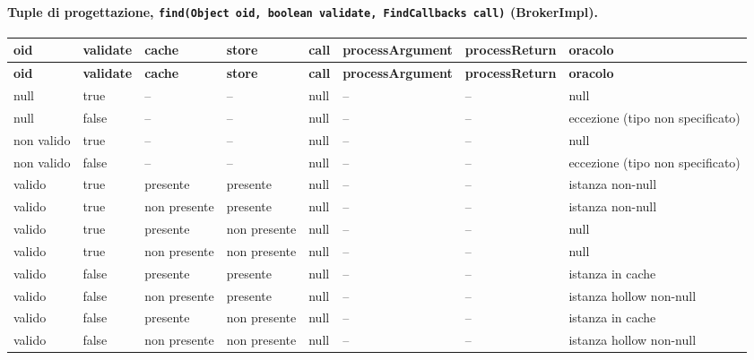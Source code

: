 \paragraph*{Tuple di progettazione, \texttt{find(Object oid, boolean validate, FindCallbacks call)} (BrokerImpl).}

{\footnotesize\setlength{\tabcolsep}{3pt}
\begin{longtable}{>{\raggedright\arraybackslash}p{}>{\raggedright\arraybackslash}p{}>{\raggedright\arraybackslash}p{}>{\raggedright\arraybackslash}p{}>{\raggedright\arraybackslash}p{}>{\raggedright\arraybackslash}p{}>{\raggedright\arraybackslash}p{}>{\raggedright\arraybackslash}p{}}
\toprule
\textbf{oid} & \textbf{validate} & \textbf{cache} & \textbf{store} & \textbf{call} & \textbf{processArgument} & \textbf{processReturn} & \textbf{oracolo} \\
\midrule
\endfirsthead
\toprule
\textbf{oid} & \textbf{validate} & \textbf{cache} & \textbf{store} & \textbf{call} & \textbf{processArgument} & \textbf{processReturn} & \textbf{oracolo} \\
\midrule
\endhead
\bottomrule
\endfoot
null & true & -- & -- & null & -- & -- & null \\
null & false & -- & -- & null & -- & -- & eccezione (tipo non specificato) \\
non valido & true & -- & -- & null & -- & -- & null \\
non valido & false & -- & -- & null & -- & -- & eccezione (tipo non specificato) \\
valido & true & presente & presente & null & -- & -- & istanza non-null \\
valido & true & non presente & presente & null & -- & -- & istanza non-null \\
valido & true & presente & non presente & null & -- & -- & null \\
valido & true & non presente & non presente & null & -- & -- & null \\
valido & false & presente & presente & null & -- & -- & istanza in cache \\
valido & false & non presente & presente & null & -- & -- & istanza hollow non-null \\
valido & false & presente & non presente & null & -- & -- & istanza in cache \\
valido & false & non presente & non presente & null & -- & -- & istanza hollow non-null \\

\end{longtable}}
